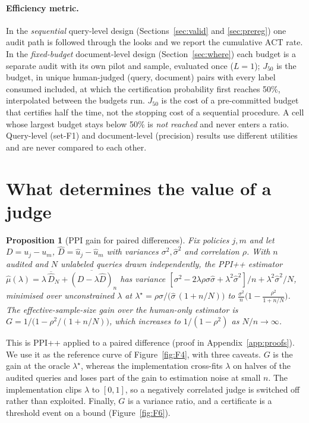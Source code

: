 \documentclass{article}
\newtheorem{proposition}{Proposition}
\newcommand{\ACT}{\mathrm{ACT}}
\newcommand{\Jfifty}{J_{50}}
\begin{document}
\paragraph{Efficiency metric.} In the \emph{sequential} query-level design (Sections~\ref{sec:valid} and \ref{sec:prereg}) one audit path is followed through the looks and we report the cumulative $\ACT$ rate. In the \emph{fixed-budget} document-level design (Section~\ref{sec:where}) each budget is a separate audit with its own pilot and sample, evaluated once ($L=1$); $\Jfifty$ is the budget, in unique human-judged (query, document) pairs with every label consumed included, at which the certification probability first reaches 50\%, interpolated between the budgets run. $\Jfifty$ is the cost of a pre-committed budget that certifies half the time, not the stopping cost of a sequential procedure. A cell whose largest budget stays below 50\% is \emph{not reached} and never enters a ratio. Query-level (set-F1) and document-level (precision) results use different utilities and are never compared to each other.

\section{What determines the value of a judge}\label{sec:judge}
\begin{proposition}[PPI gain for paired differences]\label{prop:A}
Fix policies $j,m$ and let $D=u_j-u_m$, $\hat D=\hat u_j-\hat u_m$ with variances $\sigma^2,\hat\sigma^2$ and correlation $\rho$. With $n$ audited and $N$ unlabeled queries drawn independently, the PPI++ estimator $\hat\mu(\lambda)=\lambda\,\overline{\hat D}_N+\overline{(D-\lambda\hat D)}_n$ has variance $[\sigma^2-2\lambda\rho\sigma\hat\sigma+\lambda^2\hat\sigma^2]/n+\lambda^2\hat\sigma^2/N$, minimised over unconstrained $\lambda$ at $\lambda^\star=\rho\sigma/\big(\hat\sigma\,(1+n/N)\big)$ to $\frac{\sigma^2}{n}\big(1-\frac{\rho^2}{1+n/N}\big)$. The effective-sample-size gain over the human-only estimator is $G=1/\big(1-\rho^2/(1+n/N)\big)$, which increases to $1/(1-\rho^2)$ as $N/n\to\infty$.
\end{proposition}
This is PPI++ \citep{angelopoulos2023ppipp} applied to a paired difference (proof in Appendix~\ref{app:proofs}). We use it as the reference curve of Figure~\ref{fig:F4}, with three caveats. $G$ is the gain at the oracle $\lambda^\star$, whereas the implementation cross-fits $\lambda$ on halves of the audited queries and loses part of the gain to estimation noise at small $n$. The implementation clips $\lambda$ to $[0,1]$, so a negatively correlated judge is switched off rather than exploited. Finally, $G$ is a variance ratio, and a certificate is a threshold event on a bound (Figure~\ref{fig:F6}).
\end{document}
